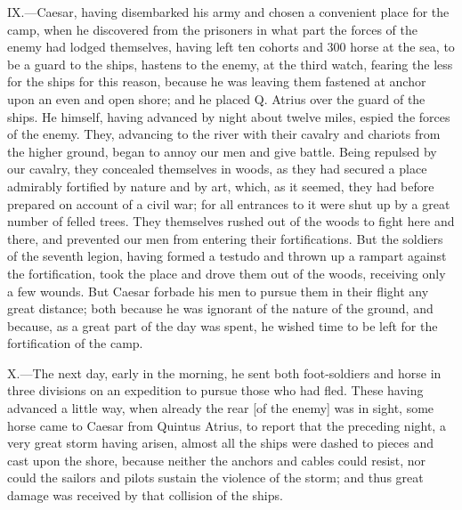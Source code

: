 IX.—Caesar, having disembarked his army and chosen a convenient place
for the camp, when he discovered from the prisoners in what part the
forces of the enemy had lodged themselves, having left ten cohorts and
300 horse at the sea, to be a guard to the ships, hastens to the enemy,
at the third watch, fearing the less for the ships for this reason,
because he was leaving them fastened at anchor upon an even and open
shore; and he placed Q. Atrius over the guard of the ships. He himself,
having advanced by night about twelve miles, espied the forces of the
enemy. They, advancing to the river with their cavalry and chariots from
the higher ground, began to annoy our men and give battle. Being
repulsed by our cavalry, they concealed themselves in woods, as they had
secured a place admirably fortified by nature and by art, which, as it
seemed, they had before prepared on account of a civil war; for all
entrances to it were shut up by a great number of felled trees. They
themselves rushed out of the woods to fight here and there, and
prevented our men from entering their fortifications. But the soldiers
of the seventh legion, having formed a testudo and thrown up a rampart
against the fortification, took the place and drove them out of the
woods, receiving only a few wounds. But Caesar forbade his men to pursue
them in their flight any great distance; both because he was ignorant of
the nature of the ground, and because, as a great part of the day was
spent, he wished time to be left for the fortification of the camp.

X.—The next day, early in the morning, he sent both foot-soldiers and
horse in three divisions on an expedition to pursue those who had fled.
These having advanced a little way, when already the rear [of the enemy]
was in sight, some horse came to Caesar from Quintus Atrius, to report
that the preceding night, a very great storm having arisen, almost all
the ships were dashed to pieces and cast upon the shore, because neither
the anchors and cables could resist, nor could the sailors and pilots
sustain the violence of the storm; and thus great damage was received by
that collision of the ships.

